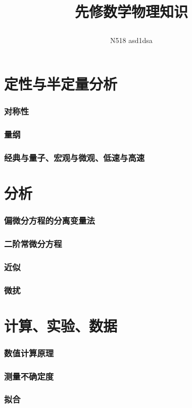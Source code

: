 \documentclass[10pt]{article}
\title{
	\begin{center}
		{\Huge 先修数学物理知识}%
	\end{center}
}
\author{N518 asd1dsa}
\affiliation{
哈尔滨工业大学（威海）\\
理学院
}
\begin{document}
	\maketitle
	\flushbottom
	\newpage
	\pagestyle{fancynotes}
	\part{定性与半定量分析}
		\section{对称性}
		\section{量纲}
		\section{经典与量子、宏观与微观、低速与高速}

	\part{分析}
		\section{偏微分方程的分离变量法}
		\section{二阶常微分方程}
		\section{近似}
		\section{微扰}

	\part{计算、实验、数据}
		\section{数值计算原理}
		\section{测量不确定度}
		\section{拟合}
\end{document}

